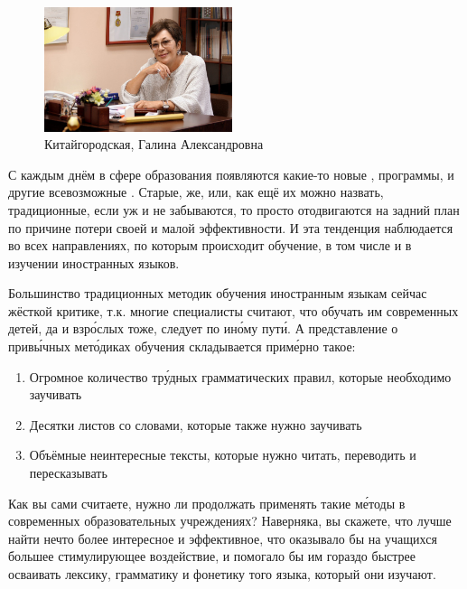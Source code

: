 \begin{figure}
    \begin{center}
        \includegraphics[width=0.49\textwidth]{img/kitaigorodskoi.jpg}
    \end{center}
    \caption{Китайгородская, Галина Александровна}
\end{figure}
С каждым днём в сфере образования появляются какие-то новые , программы,  и другие всевозможные . Старые, же, или, как ещё их можно назвать, традиционные, если уж и не забываются, то просто отодвигаются на задний план по причине потери своей  и малой эффективности. И эта тенденция наблюдается во всех направлениях, по которым происходит обучение, в том числе и в изучении иностранных языков.

Большинство традиционных методик обучения иностранным языкам сейчас  жёсткой критике, т.к. многие специалисты считают, что обучать им современных детей, да и взр\'{о}слых тоже, следует по ин\'{о}му пут\'{и}. А представление о прив\'{ы}чных мет\'{о}диках обучения складывается прим\'{е}рно такое:
\begin{enumerate}
    \item Огромное количество тр\'{у}дных грамматических правил, которые необходимо заучивать
    \item Десятки листов со словами, которые также нужно заучивать
    \item Объёмные неинтересные тексты, которые нужно читать, переводить и пересказывать
\end{enumerate}

Как вы сами считаете, нужно ли продолжать применять такие м\'{е}тоды в современных образовательных учреждениях? Наверняка, вы скажете, что лучше найти нечто более интересное и эффективное, что оказывало бы на учащихся большее стимулирующее воздействие, и помогало бы им гораздо быстрее осваивать лексику, грамматику и фонетику того языка, который они изучают.

